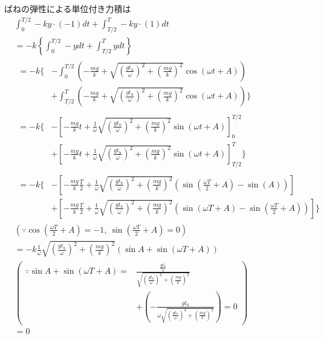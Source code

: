 \documentclass[a4paper,11pt]{jsarticle}
\begin{document}
ばねの弾性による単位付き力積は
\begin{align}
   & \int_{0}^{T/2} -ky \cdot (-1) dt
  + \int_{T/2}^{T} -ky \cdot (1) dt
  \\
   & = -k \left\{
  \int_{0}^{T/2} -y dt + \int_{T/2}^{T} y dt
  \right\}
  \\
   &
  \begin{aligned}
    = -k \Bigg\{
     & - \int_{0}^{T/2} \left(
    -\frac{mg}{k} + \sqrt{\left(\frac{gt_h}{\omega}\right)^2 + \left(\frac{mg}{k}\right)^2}\cos \left( \omega t + A \right)
    \right)
    \\
     & + \int_{T/2}^{T} \left(
    -\frac{mg}{k} + \sqrt{\left(\frac{gt_h}{\omega}\right)^2 + \left(\frac{mg}{k}\right)^2}\cos \left( \omega t + A \right)
    \right) \Bigg\}
  \end{aligned}
  \\
   & \begin{aligned}
       = -k \Bigg\{
        & - \left[
         -\frac{mg}{k}t + \frac{1}{\omega} \sqrt{\left(\frac{gt_h}{\omega}\right)^2 + \left(\frac{mg}{k}\right)^2} \sin (\omega t + A)
         \right]_0^{T/2}
       \\
        & + \left[
         -\frac{mg}{k}t + \frac{1}{\omega} \sqrt{\left(\frac{gt_h}{\omega}\right)^2 + \left(\frac{mg}{k}\right)^2} \sin (\omega t + A)
         \right]_{T/2}^T
       \Bigg\}
     \end{aligned}
  \\
   & \begin{aligned}
       = -k \Bigg\{
        & - \left[
         -\frac{mg}{k}\frac{T}{2} + \frac{1}{\omega} \sqrt{\left(\frac{gt_h}{\omega}\right)^2 + \left(\frac{mg}{k}\right)^2} (\sin(\frac{\omega T}{2} + A) - \sin(A))
         \right]
       \\
        & + \left[
         -\frac{mg}{k}\frac{T}{2} + \frac{1}{\omega} \sqrt{\left(\frac{gt_h}{\omega}\right)^2 + \left(\frac{mg}{k}\right)^2} (\sin(\omega T + A) - \sin(\frac{\omega T}{2} + A))
         \right]
       \Bigg\}
     \end{aligned}
  \\
   & \left( \because \cos (\frac{\omega T}{2} + A) = -1, \ \sin (\frac{\omega T}{2} + A) = 0 \right)
  \\
   & = -k \frac{1}{\omega} \sqrt{\left(\frac{gt_h}{\omega}\right)^2 + \left(\frac{mg}{k}\right)^2} \left(\sin A + \sin (\omega T + A)\right)
  \\
   & \left(
  \begin{aligned}
      \because \sin A + \sin (\omega T + A) =
       & \frac{\frac{gt_h}{\omega}}{\sqrt{\left(\frac{gt_h}{\omega}\right)^2 + \left(\frac{mg}{k}\right)^2}}
      \\
       & + \left( - \frac{gt_h}{ \omega \sqrt{\left(\frac{gt_h}{\omega}\right)^2 + \left(\frac{mg}{k}\right)^2} } \right)
      = 0
    \end{aligned}
  \right)
  \\
   & = 0
\end{align}
\end{document}

